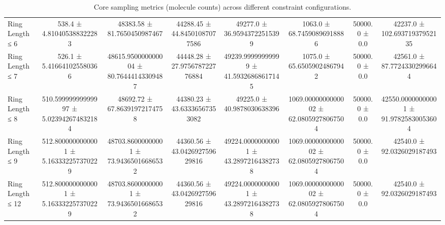 \begin{table}[H]
\begin{tabular}{l c c c c c c c}
        Ring Length ≤ 6 & 538.4 ± 4.810405388322283 & 48383.58 ± 81.7650450987467 & 44288.45 ± 44.84501087077586 & 49277.0 ± 36.95943722515399 & 1063.0 ± 68.74590896918886 & 50000.0 ± 0.0 & 42237.0 ± 102.69371937952135 \\
        Ring Length ≤ 7 & 526.1 ± 5.416641025580366 & 48615.950000000004 ± 80.76444143309487 & 44448.28 ± 27.975678722776884 & 49239.99999999999 ± 41.59326868617145 & 1075.0 ± 65.65059024867942 & 50000.0 ± 0.0 & 42561.0 ± 87.77243302996644 \\
        Ring Length ≤ 8 & 510.59999999999997 ± 5.023942674832184 & 48692.72 ± 67.86391972174758 & 44380.23 ± 43.63336567353082 & 49225.0 ± 40.9878030638396 & 1069.0000000000002 ± 62.08059278067504 & 50000.0 ± 0.0 & 42550.00000000001 ± 91.97825830053604 \\
        Ring Length ≤ 9 & 512.8000000000001 ± 5.163332257370229 & 48703.86000000001 ± 73.94365016686532 & 44360.56 ± 43.042692759629816 & 49224.00000000001 ± 43.28972164382738 & 1069.0000000000002 ± 62.08059278067504 & 50000.0 ± 0.0 & 42540.0 ± 92.0326029187493 \\
        Ring Length ≤ 12 & 512.8000000000001 ± 5.163332257370229 & 48703.86000000001 ± 73.94365016686532 & 44360.56 ± 43.042692759629816 & 49224.00000000001 ± 43.28972164382738 & 1069.0000000000002 ± 62.08059278067504 & 50000.0 ± 0.0 & 42540.0 ± 92.0326029187493 \\
        \bottomrule
    \end{tabular}
    \caption{Core sampling metrics (molecule counts) across different constraint configurations.}
\end{table}